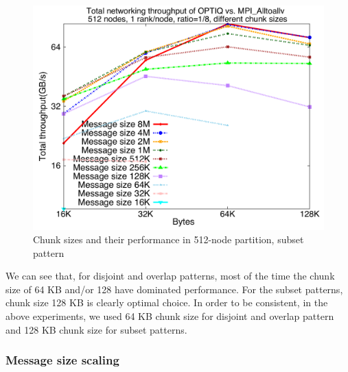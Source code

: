\begin{figure}[!htb]
\vspace{-0.1in}
\centering
\includegraphics[scale=0.30]{figures/87_chunksize.pdf}
\vspace{-0.1in}
\caption{Chunk sizes and their performance in 512-node partition, subset pattern}
\vspace{-0.1in}
\label{fig:chunksize}
\end{figure}

We can see that, for disjoint and overlap patterns, most of the time the chunk size of 64 KB and/or 128 have dominated performance. For the subset patterns, chunk size 128 KB is clearly optimal choice. In order to be consistent, in the above experiments, we used 64 KB chunk size for disjoint and overlap pattern and 128 KB chunk size for subset patterns.

\subsubsection{Message size scaling}

